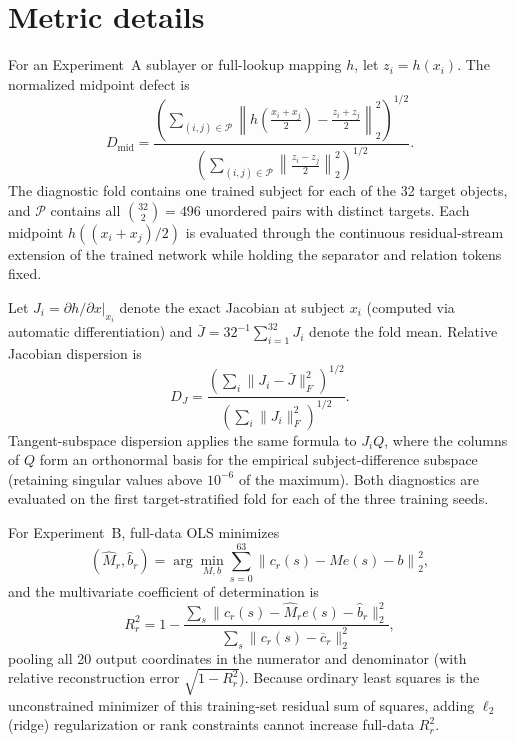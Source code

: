 \documentclass[11pt]{article}
\begin{document}
\section{Metric details}
\label{app:metrics}

For an Experiment~A sublayer or full-lookup mapping $h$, let $z_i=h(x_i)$. The
normalized midpoint defect is
\begin{equation}
  D_{\mathrm{mid}}=
  \frac{\left(\sum_{(i,j)\in\mathcal P}
  \left\|h\left(\tfrac{x_i+x_j}{2}\right)
  -\tfrac{z_i+z_j}{2}\right\|_2^2\right)^{1/2}}
  {\left(\sum_{(i,j)\in\mathcal P}
  \left\|\tfrac{z_i-z_j}{2}\right\|_2^2\right)^{1/2}}.
\end{equation}
The diagnostic fold contains one trained subject for each of the 32 target
objects, and $\mathcal P$ contains all $\binom{32}{2}=496$ unordered pairs with
distinct targets. Each midpoint $h((x_i+x_j)/2)$ is evaluated through the
continuous residual-stream extension of the trained network while holding the
separator and relation tokens fixed.

Let $J_i=\partial h/\partial x\vert_{x_i}$ denote the exact Jacobian at subject
$x_i$ (computed via automatic differentiation) and $\bar J=32^{-1}\sum_{i=1}^{32} J_i$
denote the fold mean. Relative Jacobian dispersion is
\begin{equation}
  D_J=\frac{\left(\sum_i\|J_i-\bar J\|_F^2\right)^{1/2}}
  {\left(\sum_i\|J_i\|_F^2\right)^{1/2}}.
\end{equation}
Tangent-subspace dispersion applies the same formula to $J_iQ$, where the
columns of $Q$ form an orthonormal basis for the empirical subject-difference
subspace (retaining singular values above $10^{-6}$ of the maximum). Both
diagnostics are evaluated on the first target-stratified fold for each of the
three training seeds.

For Experiment~B, full-data OLS minimizes
\begin{equation}
  (\widehat M_r,\widehat b_r)=\arg\min_{M,b}\sum_{s=0}^{63}
  \left\|c_r(s)-Me(s)-b\right\|_2^2,
\end{equation}
and the multivariate coefficient of determination is
\begin{equation}
  R_r^2=1-
  \frac{\sum_s\|c_r(s)-\widehat M_re(s)-\widehat b_r\|_2^2}
       {\sum_s\|c_r(s)-\overline c_r\|_2^2},
\end{equation}
pooling all 20 output coordinates in the numerator and denominator (with
relative reconstruction error $\sqrt{1-R_r^2}$). Because ordinary least squares
is the unconstrained minimizer of this training-set residual sum of squares,
adding $\ell_2$ (ridge) regularization or rank constraints cannot increase
full-data $R_r^2$.
\end{document}

